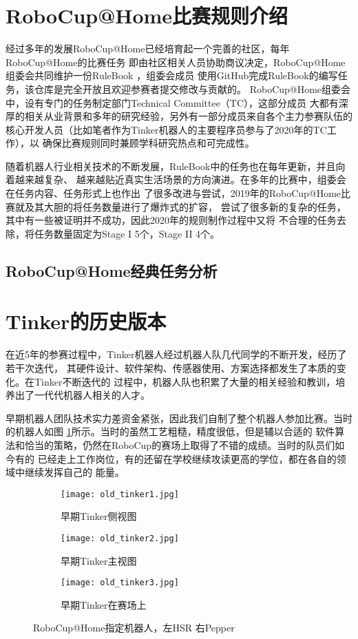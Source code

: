 \section{RoboCup@Home比赛规则介绍}

经过多年的发展RoboCup@Home已经培育起一个完善的社区，每年RoboCup@Home的比赛任务
即由社区相关人员协助商议决定，RoboCup@Home组委会共同维护一份RuleBook\cite{rulebook}
，组委会成员
使用GitHub完成RuleBook的编写任务，该仓库是完全开放且欢迎参赛者提交修改与贡献的。
RoboCup@Home组委会中，设有专门的任务制定部门Technical Committee（TC），这部分成员
大都有深厚的相关从业背景和多年的研究经验，另外有一部分成员来自各个主力参赛队伍的
核心开发人员（比如笔者作为Tinker机器人的主要程序员参与了2020年的TC工作），以
确保比赛规则同时兼顾学科研究热点和可完成性。

随着机器人行业相关技术的不断发展，RuleBook中的任务也在每年更新，并且向着越来越复杂、
越来越贴近真实生活场景的方向演进。在多年的比赛中，组委会在任务内容、任务形式上也作出
了很多改进与尝试，2019年的RoboCup@Home比赛就及其大胆的将任务数量进行了爆炸式的扩容，
尝试了很多新的复杂的任务，其中有一些被证明并不成功，因此2020年的规则制作过程中又将
不合理的任务去除，将任务数量固定为Stage I 5个，Stage II 4个。

\subsection{RoboCup@Home经典任务分析}




\section{Tinker的历史版本}

在近5年的参赛过程中，Tinker机器人经过机器人队几代同学的不断开发，经历了若干次迭代，
其硬件设计、软件架构、传感器使用、方案选择都发生了本质的变化。在Tinker不断迭代的
过程中，机器人队也积累了大量的相关经验和教训，培养出了一代代机器人相关的人才。

早期机器人团队技术实力差资金紧张，因此我们自制了整个机器人参加比赛。当时的机器人如图
\ref{fig:old_tinker}所示。当时的虽然工艺粗糙，精度很低，但是辅以合适的
软件算法和恰当的策略，仍然在RoboCup的赛场上取得了不错的成绩。当时的队员们如今有的
已经走上工作岗位，有的还留在学校继续攻读更高的学位，都在各自的领域中继续发挥自己的
能量。


\begin{figure}[H]
\centering
\begin{subfigure}{.5\textwidth}
  \centering
  \texttt{[image: old\_tinker1.jpg]}
  \caption{早期Tinker侧视图}
\end{subfigure}%
\begin{subfigure}{.5\textwidth}
  \centering
  \texttt{[image: old\_tinker2.jpg]}
  \caption{早期Tinker主视图}
\end{subfigure}
\begin{subfigure}{.8\textwidth}
  \centering
  \texttt{[image: old\_tinker3.jpg]}
  \caption{早期Tinker在赛场上}
\end{subfigure}
\caption{RoboCup@Home指定机器人，左HSR 右Pepper}
\label{fig:old_tinker}
\end{figure}

